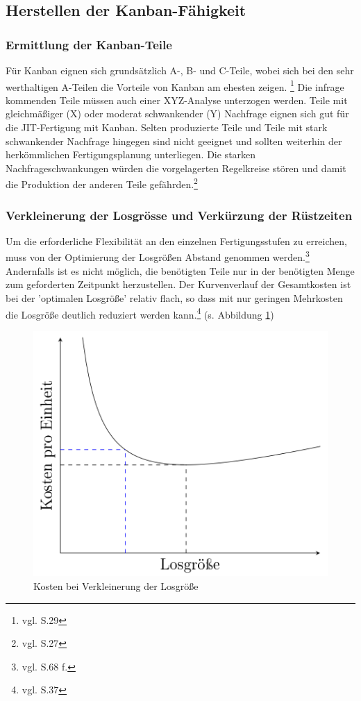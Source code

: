 \subsection{Herstellen der Kanban-Fähigkeit}
\subsubsection{Ermittlung der Kanban-Teile}
Für Kanban eignen sich grundsätzlich A-, B- und C-Teile, wobei sich bei den sehr 
werthaltigen A-Teilen die Vorteile von Kanban am ehesten zeigen. \footnote{vgl. \cite{Geiger2011Kanban} S.29}
Die infrage kommenden Teile müssen auch einer XYZ-Analyse unterzogen werden. 
Teile mit gleichmäßiger (X) oder moderat schwankender (Y) Nachfrage eignen sich gut für die JIT-Fertigung mit Kanban.
Selten produzierte Teile und Teile mit stark schwankender Nachfrage hingegen sind nicht geeignet und sollten 
weiterhin der herkömmlichen Fertigungsplanung unterliegen. Die starken Nachfrageschwankungen 
würden die vorgelagerten Regelkreise stören und damit die Produktion der anderen Teile gefährden.\footnote{vgl. \cite{Geiger2011Kanban} S.27}

\subsubsection{Verkleinerung der Losgrösse und Verkürzung der Rüstzeiten}
Um die erforderliche Flexibilität an den einzelnen Fertigungsstufen zu erreichen, 
muss von der Optimierung der Losgrößen Abstand genommen werden.\footnote{vgl. \cite{Takeda2012SPS} S.68 f.}
Andernfalls ist es nicht möglich, die benötigten Teile nur in der benötigten Menge zum geforderten Zeitpunkt herzustellen.
Der Kurvenverlauf der Gesamtkosten ist bei der 'optimalen Losgröße' relativ flach, 
so dass mit nur geringen Mehrkosten die Losgröße deutlich reduziert werden kann.\footnote{vgl. \cite{Geiger2011Kanban} S.37}
(s. Abbildung \ref{Losgroesse})
\begin{figure}[h]
\centering
\includegraphics[width=.60\textwidth]{img/losgroessenverkleinerung.png}
\caption[Kosten bei Verkleinerung der Losgröße]{Kosten bei Verkleinerung der Losgröße\footnotemark}
\label{Losgroesse}
\end{figure}

